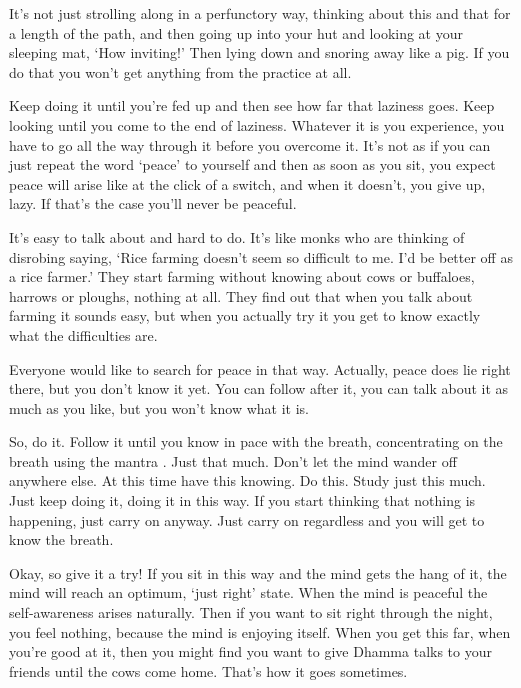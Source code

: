 It's not just strolling along in a perfunctory way, thinking about this and that for a length of the path, and then going up into your hut and looking at your sleeping mat, `How inviting!' Then lying down and snoring away like a pig. If you do that you won't get anything from the practice at all.

Keep doing it until you're fed up and then see how far that laziness goes. Keep looking until you come to the end of laziness. Whatever it is you experience, you have to go all the way through it before you overcome it. It's not as if you can just repeat the word `peace' to yourself and then as soon as you sit, you expect peace will arise like at the click of a switch, and when it doesn't, you give up, lazy. If that's the case you'll never be peaceful.

It's easy to talk about and hard to do. It's like monks who are thinking of disrobing saying, `Rice farming doesn't seem so difficult to me. I'd be better off as a rice farmer.' They start farming without knowing about cows or buffaloes, harrows or ploughs, nothing at all. They find out that when you talk about farming it sounds easy, but when you actually try it you get to know exactly what the difficulties are.

Everyone would like to search for peace in that way. Actually, peace does lie right there, but you don't know it yet. You can follow after it, you can talk about it as much as you like, but you won't know what it is.

So, do it. Follow it until you know in pace with the breath, concentrating on the breath using the mantra . Just that much. Don't let the mind wander off anywhere else. At this time have this knowing. Do this. Study just this much. Just keep doing it, doing it in this way. If you start thinking that nothing is happening, just carry on anyway. Just carry on regardless and you will get to know the breath.

Okay, so give it a try! If you sit in this way and the mind gets the hang of it, the mind will reach an optimum, `just right' state. When the mind is peaceful the self-awareness arises naturally. Then if you want to sit right through the night, you feel nothing, because the mind is enjoying itself. When you get this far, when you're good at it, then you might find you want to give Dhamma talks to your friends until the cows come home. That's how it goes sometimes.

